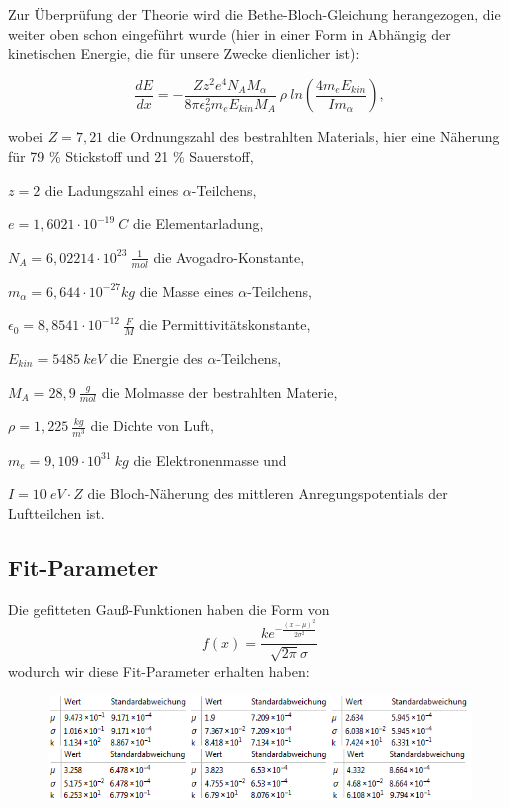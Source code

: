 \documentclass[bigchapter,colorback,accentcolor=tud4b,linedtoc,11pt]{tudreport}
\begin{document}
Zur Überprüfung der Theorie wird die Bethe-Bloch-Gleichung herangezogen, die weiter oben schon eingeführt wurde (hier in einer Form in Abhängig der kinetischen Energie, die für unsere Zwecke dienlicher ist): 

$$\frac{dE}{dx} = - \frac{Z z^2 e^4 N_A M_{\alpha}}{8 \pi \epsilon_o^2 m_e E_{kin} M_A}~\rho ~ ln \left( \frac{4 m_e E_{kin}}{I m_{\alpha}} \right),$$

wobei
$Z = 7,21$ die Ordnungszahl des bestrahlten Materials, hier eine Näherung für 79 \% Stickstoff und 21 \% Sauerstoff,

$z = 2$ die Ladungszahl eines $\alpha$-Teilchens,

$e = 1,6021 \cdot 10^{-19}~C$ die Elementarladung,

$N_A = 6,02214 \cdot 10^{23}~ \frac{1}{mol}$ die Avogadro-Konstante, 

$m_{\alpha} = 6,644 \cdot 10^{-27} kg$ die Masse eines $\alpha$-Teilchens,

$\epsilon_0 = 8,8541 \cdot 10^{-12}~ \frac{F}{M}$ die Permittivitätskonstante,

$E_{kin} = 5485~keV$ die Energie des $\alpha$-Teilchens,

$M_A = 28,9~ \frac{g}{mol}$ die Molmasse der bestrahlten Materie, 

$\rho = 1,225~ \frac{kg}{m^3}$ die Dichte von Luft,

$m_e = 9,109 \cdot 10^{31}~ kg$ die Elektronenmasse und

$I = 10~ eV \cdot Z$ die Bloch-Näherung des mittleren Anregungspotentials der Luftteilchen ist.

\subsection{Fit-Parameter}
Die gefitteten Gauß-Funktionen haben die Form von 
$$f(x)=\frac{k e^{-\frac{(x-\mu )^2}{2 \sigma ^2}}}{\sqrt{2 \pi } \sigma }$$
wodurch wir diese Fit-Parameter erhalten haben:
\begin{figure}[H]
\centering
    \includegraphics[scale=1]{img/air-gauss-fits.png}
\end{figure}
\end{document}
